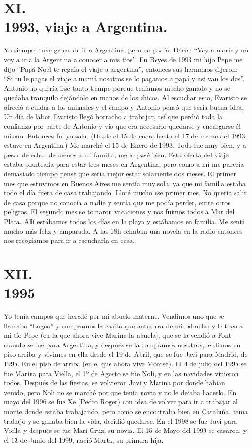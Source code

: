 \documentclass[12pt,a5paper]{book}
\begin{document}
\section*{XI.\\1993, viaje a Argentina.}

Yo siempre tuve ganas de ir a Argentina, pero no podía. Decía: “Voy a morir y no voy a ir a la Argentina a conocer a mis tíos”. 
En Reyes de 1993 mi hijo Pepe me dijo “Papá Noel te regala el viaje a argentina”, entonces sus hermanos dijeron: “Si tu le pagas el viaje a mamá nosotros se lo pagamos a papá y así van los dos”. 
Antonio no quería irse tanto tiempo porque teníamos mucho ganado y no se quedaba tranquilo dejándolo en manos de los chicos. Al escuchar esto, Evaristo se ofreció a cuidar a los animales y el campo y Antonio pensó que sería buena idea. Un día de labor Evaristo llegó borracho a trabajar, así que perdió toda la confianza por parte de Antonio y vio que era necesario quedarse y encargarse él mismo.
Entonces fui yo sola. (Desde el 15 de enero hasta el 17 de marzo del 1993 estuve en Argentina.)
 Me marché el 15 de Enero  de 1993. Todo fue muy bien, y a pesar de echar de menos a mi familia, me lo pasé bien.
Esta oferta del viaje estaba planteada para estar tres meses en Argentina, pero como a mí me parecía demasiado tiempo pensé que sería mejor estar solamente dos meses.
El primer mes que estuvimos en Buenos Aires me sentía muy sola, ya que mi familia estaba todo el día fuera de casa trabajando. Lloré mucho ese primer mes. No quería salir de casa porque no conocía a nadie y sentía que me podía perder, entre otros peligros.
El segundo mes se tomaron vacaciones y nos fuimos todos a Mar del Plata. Allí estábamos todos los días en la playa y estábamos en familia. Me sentí mucho más feliz y amparada. A las 18h echaban una novela en la radio entonces nos recogíamos para ir a escucharla en casa.



\section*{XII.\\1995}

Yo tenía campos que heredé por mi abuelo materno. Vendimos uno que se llamaba “Lagoa” y compramos la casita que antes era de mis abuelos y le tocó a mi tío Pepe (en la que ahora vive Marina la abuela), que se la vendió a Font cuando se fue para Argentina, y después se la compramos nosotros, le dimos un piso arriba y vivimos en ella desde el 19 de Abril, que se fue Javi para Madrid, de 1995. En el piso de arriba (en el que ahora vive Montse).
El 4 de julio del 1995 se fue Marina para Viella, el 1º de Agosto se fue Noli, y en las navidades vinieron todos. Después de las fiestas, se volvieron Javi y Marina por donde habían venido, pero Noli no se marchó por que tenía novia y no le dejaba hacerlo. En mayo del 1996 se fue Xe (Pedro Roger) con idea de volver para ir a trabajar al monte donde estaba trabajando, pero como se encontraba bien en Cataluña, tenía trabajo y se ganaba bien la vida, decidió quedarse.
En el 1998 se fue Javi para Viella y después se fue Mari Cruz, su novia. El 15 de Mayo del 1999 se casaron, y el 13 de Junio del 1999, nació Marta, su primera hija.
\end{document}
